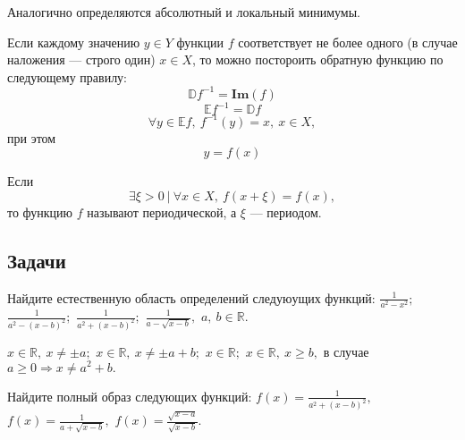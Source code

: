 Аналогично определяются абсолютный и локальный минимумы.
\begin{definition}
Если каждому значению $y \in Y$ функции $f$ соответствует не более одного (в случае наложения --- строго
один) $x \in X$, то можно постороить обратную функцию по следующему правилу:
$$\mathbb{D}f^{-1} = \mathbf{Im}(f)$$
$$\mathbb{E}f^{-1} = \mathbb{D}f$$
$$\forall y \in \mathbb{E}f,~f^{-1}(y)=x,~x \in X,$$
при этом
$$y=f(x)$$
\end{definition}
\begin{definition}
Если $$\exists \xi > 0~|~\forall x \in X,~f(x+\xi)=f(x),$$
то функцию $f$ называют периодической, а $\xi$ --- периодом.
\end{definition}
\subsection*{Задачи}
\begin{task}
Найдите естественную область определений следуюущих функций:
$\frac{1}{a^2-x^2};$
$\frac{1}{a^2-(x-b)^2};$
$\frac{1}{a^2+(x-b)^2};$
$\frac{1}{a-\sqrt{x-b}},$ $a,~b \in \mathbb{R}.$
\end{task}
\begin{solution}
$x\in \mathbb{R},~x \ne \pm a; $
$x \in \mathbb{R},~x \ne \pm a+b; $
$x \in \mathbb{R};$
$x \in \mathbb{R},~x \ge b,$ в случае
$a \ge 0 \Rightarrow x \ne a^2 + b.$
\end{solution}
\begin{task}
Найдите полный образ следующих функций:
$f(x)=\frac{1}{a^2 + (x-b)^2},$
$f(x)=\frac{1}{a + \sqrt{x-b}},$
$f(x)=\frac{\sqrt{x-a}}{\sqrt{x-b}}.$
\end{task}
